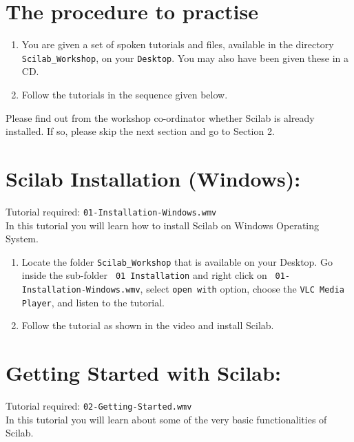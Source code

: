\documentclass[11pt]{article}
\newenvironment{enumcpt}{\begin{enumerate} \topsep 0pt \partopsep 0pt 
                        \parsep 0pt
                        \itemsep 0pt \leftmargin -1in \rightmargin 0pt
                        }{\end{enumerate}}
\begin{document}
\begin{multicols}{2}

\section*{The procedure to practise}
\begin{enumcpt}
\item You are given a set of spoken tutorials and files, available in
  the directory {\tt Scilab\_Workshop}, on your {\tt Desktop}.  You
  may also have been given these in a CD.
\item Follow the tutorials in the sequence given below.
\end{enumcpt}

Please find out from the workshop co-ordinator whether Scilab is
already installed.  If so, please skip the next section and go to
Section 2.

\section{Scilab Installation (Windows):}
Tutorial required: {\tt 01-Installation-Windows.wmv}
\\ In this tutorial you will learn how to install Scilab on Windows Operating System.

\begin{enumcpt}
\item Locate the folder {\tt Scilab\_Workshop} that is available on
  your Desktop.  Go inside the sub-folder {\tt
    01 Installation} and right click on {\tt
    01-Installation-Windows.wmv}, select {\tt open with} option,
  choose the {\tt VLC Media Player}, and listen to the tutorial.
\item Follow the tutorial as shown in the video and install
  Scilab. 
\end{enumcpt}

\section{Getting Started with Scilab:}
Tutorial required: {\tt 02-Getting-Started.wmv} \\ In this tutorial you will learn about some of the very basic functionalities of Scilab.


\end{multicols}
\end{document}
